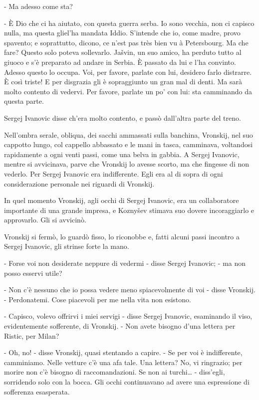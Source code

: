 - Ma adesso come sta? 

- È Dio che ci ha aiutato, con questa guerra serba. Io sono vecchia, non ci capisco nulla, ma questa gliel'ha mandata Iddio. S'intende che io, come madre, provo spavento; e soprattutto, dicono, ce n'est pas très bien vu à Petersbourg. Ma che fare? Questo solo poteva sollevarlo. Jašvin, un suo amico, ha perduto tutto al giuoco e s'è preparato ad andare in Serbia. È passato da lui e l'ha convinto. Adesso questo lo occupa. Voi, per favore, parlate con lui, desidero farlo distrarre. È così triste! E per disgrazia gli è sopraggiunto un gran mal di denti. Ma sarà molto contento di vedervi. Per favore, parlate un po' con lui: sta camminando da questa parte. 

Sergej Ivanovic disse ch'era molto contento, e passò dall'altra parte del treno. 

\label{v-7} 

Nell'ombra serale, obliqua, dei sacchi ammassati sulla banchina, Vronskij, nel suo cappotto lungo, col cappello abbassato e le mani in tasca, camminava, voltandosi rapidamente a ogni venti passi, come una belva in gabbia. A Sergej Ivanovic, mentre si avvicinava, parve che Vronskij lo avesse scorto, ma che fingesse di non vederlo. Per Sergej Ivanovic era indifferente. Egli era al di sopra di ogni considerazione personale nei riguardi di Vronskij. 

In quel momento Vronskij, agli occhi di Sergej Ivanovic, era un collaboratore importante di una grande impresa, e Koznyšev stimava suo dovere incoraggiarlo e approvarlo. Gli si avvicinò. 

Vronskij si fermò, lo guardò fisso, lo riconobbe e, fatti alcuni passi incontro a Sergej Ivanovic, gli strinse forte la mano. 

- Forse voi non desiderate neppure di vedermi - disse Sergej Ivanovic; - ma non posso esservi utile? 

- Non c'è nessuno che io possa vedere meno spiacevolmente di voi - disse Vronskij. - Perdonatemi. Cose piacevoli per me nella vita non esistono. 

- Capisco, volevo offrirvi i miei servigi - disse Sergej Ivanovic, esaminando il viso, evidentemente sofferente, di Vronskij. - Non avete bisogno d'una lettera per Ristic, per Milan? 

- Oh, no! - disse Vronskij, quasi stentando a capire. - Se per voi è indifferente, camminiamo. Nelle vetture c'è una afa tale. Una lettera? No, vi ringrazio; per morire non c'è bisogno di raccomandazioni. Se non ai turchi\ldots{} - diss'egli, sorridendo solo con la bocca. Gli occhi continuavano ad avere una espressione di sofferenza esasperata. 

